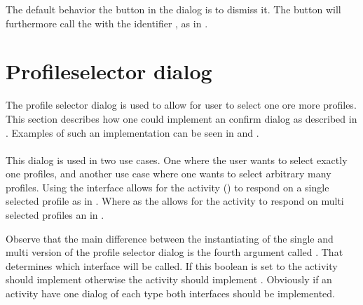 

\noindent
The default behavior the button in the dialog is to dismiss it. The button will furthermore call the  with the identifier , as in .

\section{Profileselector dialog}
\label{sec:impl_profileselector_dialog}

The profile selector dialog is used to allow for user to select one ore more profiles. This section describes how one could implement an confirm dialog as described in . Examples of such an implementation can be seen in  and .
\\\\
This dialog is used in two use cases. One where the user wants to select exactly one profiles, and another use case where one wants to select arbitrary many profiles. Using the  interface allows for the activity () to respond on a single selected profile as in . Where as the  allows for the activity to respond on multi selected profiles an in .
\begin{note}
    Observe that the main difference between the instantiating of the single and multi version of the profile selector dialog is the fourth argument called . That determines which interface will be called. If this boolean is set to  the activity should implement  otherwise the activity should implement . Obviously if an activity have one dialog of each type both interfaces should be implemented.
\end{note}

